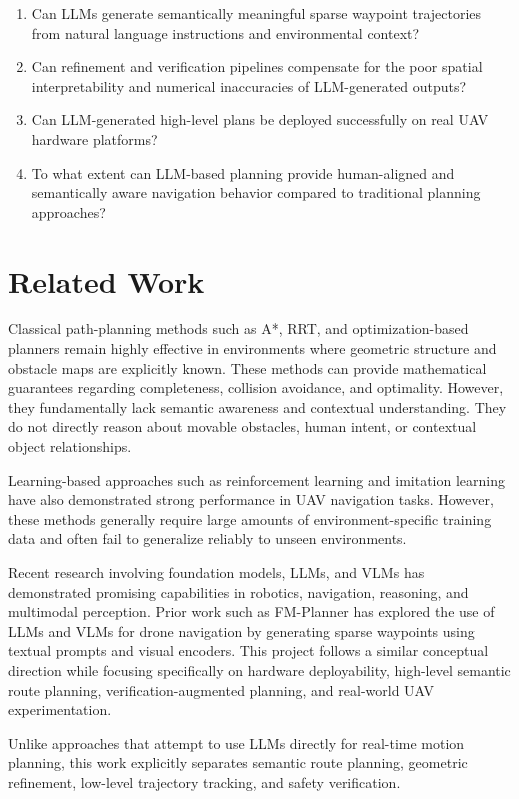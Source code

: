 \documentclass[11pt]{article}
\begin{document}
\begin{enumerate}
  \item Can LLMs generate semantically meaningful sparse waypoint trajectories from natural language instructions and environmental context?
  \item Can refinement and verification pipelines compensate for the poor spatial interpretability and numerical inaccuracies of LLM-generated outputs?
  \item Can LLM-generated high-level plans be deployed successfully on real UAV hardware platforms?
  \item To what extent can LLM-based planning provide human-aligned and semantically aware navigation behavior compared to traditional planning approaches?
\end{enumerate}

\section{Related Work}

Classical path-planning methods such as A*, RRT, and optimization-based planners remain highly effective in environments where geometric structure and obstacle maps are explicitly known. These methods can provide mathematical guarantees regarding completeness, collision avoidance, and optimality. However, they fundamentally lack semantic awareness and contextual understanding. They do not directly reason about movable obstacles, human intent, or contextual object relationships.

Learning-based approaches such as reinforcement learning and imitation learning have also demonstrated strong performance in UAV navigation tasks. However, these methods generally require large amounts of environment-specific training data and often fail to generalize reliably to unseen environments.

Recent research involving foundation models, LLMs, and VLMs has demonstrated promising capabilities in robotics, navigation, reasoning, and multimodal perception. Prior work such as FM-Planner has explored the use of LLMs and VLMs for drone navigation by generating sparse waypoints using textual prompts and visual encoders. This project follows a similar conceptual direction while focusing specifically on hardware deployability, high-level semantic route planning, verification-augmented planning, and real-world UAV experimentation.

Unlike approaches that attempt to use LLMs directly for real-time motion planning, this work explicitly separates semantic route planning, geometric refinement, low-level trajectory tracking, and safety verification.
\end{document}
